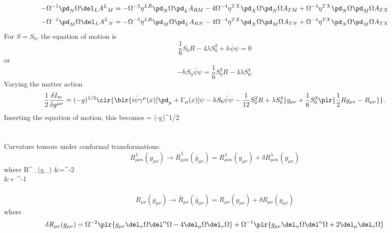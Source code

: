 \documentclass[10pt,letterpaper]{article}
\begin{document}
\[
	-\Omega^{-1} \pd_N \Omega \del_L A^L{}_M  = -\Omega^{-3} \eta^{LR} \pd_N \Omega \pd_L A_{RM} 
	- 4\Omega^{-4} \eta^{TX} \pd_X \Omega \pd_N \Omega A_{TM} + \Omega^{-4}\eta^{TX}\pd_N\Omega \pd_M \Omega A_{TX}
\]
\[
	-\Omega^{-1} \pd_M \Omega \del_L A^L{}_N  = -\Omega^{-3} \eta^{LR} \pd_M \Omega \pd_L A_{RN} 
	- 4\Omega^{-4} \eta^{TX} \pd_X \Omega \pd_M \Omega A_{TN} + \Omega^{-4}\eta^{TX}\pd_N\Omega \pd_M \Omega A_{TX}
\]
\newpage
For $S= S_0$, the equation of motion is
\[
	\frac16 S_0R-4\lambda S_0^3+h\bar\psi\psi=0
\]
or
\[
	-hS_0\bar\psi\psi = \frac16 S_0^2R - 4\lambda S_0^4.
\]
Varying the matter action
\[
	\frac12 \frac{\delta I_m}{\delta g^{\mu\nu}} = (-g)^{1/2}\clr{\blr{i\bar\psi\gamma^\mu(x)[\pd_\mu +\Gamma_\mu(x)]\psi -hS_0\bar\psi\psi 
	-\frac{1}{12}S_0^2 R +\lambda S_0^4}g_{\mu\nu} +\frac16S_0^2\plr{ \frac12 Rg_{\mu\nu} - R_{\mu\nu}}}.
\]
Inserting the equation of motion, this becomes
\ba
   = (-g)^{1/2}
\ea
\\ \\ \\
Curvature tensors under conformal transformations:
\[
	R^{\lambda}_{\mu\nu\kappa}(g_{\mu\nu}) \to \bar  R^{\lambda}_{\mu\nu\kappa}(\bar g_{\mu\nu}) = R^{\lambda}_{\mu\nu\kappa}(g_{\mu\nu}) + \delta R^{\lambda}_{\mu\nu\kappa}(g_{\mu\nu})
\]
where
\ba
	\delta R^{\lambda}_{\mu\nu\kappa}(g_{\mu\nu}) &=\Omega^{-2}\\
&\qquad + \Omega^{-1}
\ea
\\ \\
\[
	R_{\mu\nu}(g_{\mu\nu}) \to \bar R_{\mu\nu}(\bar g_{\mu\nu}) =R_{\mu\nu}(g_{\mu\nu}) + \delta R_{\mu\nu}(g_{\mu\nu})
\]
where
\[
	\delta R_{\mu\nu}(g_{\mu\nu}) = \Omega^{-2}\plr{ g_{\mu\nu}\del_\alpha\Omega \del^\alpha \Omega - 4 \del_\mu \Omega \del_\nu \Omega}
+\Omega^{-1}\plr{ g_{\mu\nu} \del_\alpha\Omega \del^\alpha\Omega + 2\del_\mu\del_\nu \Omega}
\]
\end{document}
